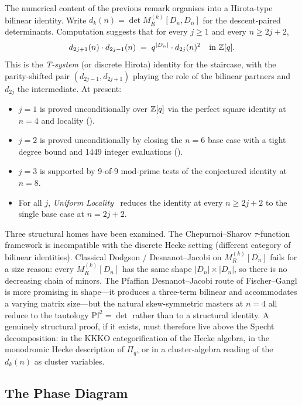 \begin{remark}
\label{rem:tsystem-hirota}
The numerical content of the previous remark organises into a
Hirota-type bilinear identity.  Write
$d_k(n) = \det M_R^{(k)}[D_n, D_n]$ for the descent-paired
determinants.  Computation suggests that for every $j \geq 1$ and
every $n \geq 2j+2$,
\[
  d_{2j+1}(n) \cdot d_{2j-1}(n)
    \;=\; q^{|D_n|} \cdot d_{2j}(n)^{2}
    \quad \text{in } \mathbb{Z}[q].
\]
This is the \emph{T-system} (or discrete Hirota) identity for the
staircase, with the parity-shifted pair $(d_{2j-1}, d_{2j+1})$
playing the role of the bilinear partners and $d_{2j}$ the
intermediate.  At present:
\begin{itemize}
\item $j = 1$ is proved unconditionally over $\mathbb{Z}[q]$ via the perfect
  square identity at $n = 4$ and locality
  (\cite{clio-first-pair-2026}).
\item $j = 2$ is proved unconditionally by closing the $n = 6$ base
  case with a tight degree bound and 1449 integer evaluations
  (\cite{clio-second-pair-2026}).
\item $j = 3$ is supported by 9-of-9 mod-prime tests of the
  conjectured identity at $n = 8$.
\item For all $j$, \emph{Uniform Locality}~\cite{clio-uniform-locality-2026}
  reduces the identity at every $n \geq 2j+2$ to the single base case
  at $n = 2j+2$.
\end{itemize}
Three structural homes have been examined.  The
Chepurnoi--Sharov $\tau$-function framework is incompatible with the
discrete Hecke setting (different category of bilinear identities).
Classical Dodgson / Desnanot--Jacobi on $M_R^{(k)}[D_n]$ fails for a
size reason: every $M_R^{(k)}[D_n]$ has the same shape $|D_n| \times
|D_n|$, so there is no decreasing chain of minors.  The
Pfaffian Desnanot--Jacobi route of Fischer--Gangl is more promising
in shape---it produces a three-term bilinear and accommodates a
varying matrix size---but the natural skew-symmetric masters at
$n = 4$ all reduce to the tautology $\mathrm{Pf}^2 = \det$ rather
than to a structural identity.  A genuinely structural proof, if it
exists, must therefore live above the Specht decomposition: in the
KKKO categorification of the Hecke algebra, in the monodromic Hecke
description of $\Pi_q$, or in a cluster-algebra reading of the
$d_k(n)$ as cluster variables.
\end{remark}


\subsection{The Phase Diagram}
\label{sec:hierarchy-diagram}

